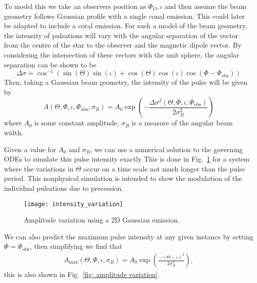 \documentclass[../full_thesis/full_thesis.tex]{subfiles}
\begin{document}
To model this we take an observers position as $\Phi_{O}, \iota$ and then
assume the beam geometry follows Gaussian profile with a single conal emission.
This could later be adapted to include a coral emission.  For such a model of
the beam geometry, the intensity of pulsations will vary with the angular
separation of the vector from the centre of the star to the observer and the
magnetic dipole vector. By considering the intersection of these vectors with
the unit sphere, the angular separation can be shown to be
\newcommand{\ThetaO}{\Theta_{\mathrm{obs}}}
\newcommand{\PhiO}{\Phi_{\mathrm{obs}}} \newcommand{\sigmaB}{\sigma_{B}}
\begin{equation}
\Delta\sigma = \cos^{-1}\left(\sin(\Theta)\sin(\iota) +
                             \cos(\Theta)\cos(\iota)\cos(\Phi - \PhiO)\right)
\label{eqn: angular sep inv cos}
\end{equation}
Then, taking a Gaussian beam geometry, the intensity of the pulse will be given by
\begin{equation}
A(\Theta, \Phi, \iota, \PhiO, \sigmaB) =
A_{0} \exp\left(-\frac{\Delta\sigma^{2}(\Theta, \Phi, \iota, \PhiO)}{2\sigmaB^{2}}\right)
\label{eqn: beam intensity}
\end{equation}
where $A_{0}$ is some constant amplitude, $\sigmaB$ is a measure of the
angular beam width.

Given a value for $A_0$ and $\sigmaB$, we can use a numerical solution to the
governing ODEs to simulate this pulse intensity exactly This is done in
Fig.~\ref{fig: intensity variation} for a system where the variations in
$\Theta$ occur on a time scale not much longer than the pulse period. This
nonphysical simulation is intended to show the modulation of the individual
pulsations due to precession.
\begin{figure}[htb]
\centering
\texttt{[image: intensity\_variation]}
\caption{Amplitude variation using a 2D Gaussian emission.}
\label{fig: intensity variation}
\end{figure}
We can also predict the maximum pulse intensity at any given instance by setting
$\Phi=\PhiO$, then simplifying we find that
\begin{align}
A_{\mathrm{max}}(\Theta, \Phi, \iota, \sigmaB) =
A_{0}\exp\left(\frac{-(\Theta-\iota)^{2}}{2\sigmaB^{2}}\right),
\label{eqn: A max}
\end{align}
this is also shown in Fig.~\ref{fig: amplitude variation}.
\end{document}
